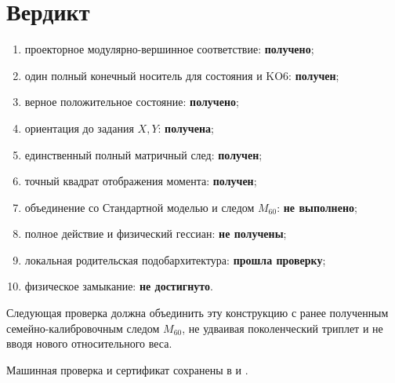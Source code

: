 \section{Вердикт}

\begin{protocol}
\begin{enumerate}
 \item проекторное модулярно-вершинное соответствие:
 \textbf{получено};
 \item один полный конечный носитель для состояния и KO6:
 \textbf{получен};
 \item верное положительное состояние:
 \textbf{получено};
 \item ориентация до задания \(X,Y\):
 \textbf{получена};
 \item единственный полный матричный след:
 \textbf{получен};
 \item точный квадрат отображения момента:
 \textbf{получен};
 \item объединение со Стандартной моделью и следом \(M_{60}\):
 \textbf{не выполнено};
 \item полное действие и физический гессиан:
 \textbf{не получены};
 \item локальная родительская подобархитектура:
 \textbf{прошла проверку};
 \item физическое замыкание:
 \textbf{не достигнуто}.
\end{enumerate}
\end{protocol}

Следующая проверка должна объединить эту конструкцию с ранее полученным
семейно-калибровочным следом \(M_{60}\), не удваивая поколенческий триплет и
не вводя нового относительного веса.

Машинная проверка и сертификат сохранены в
 и
.